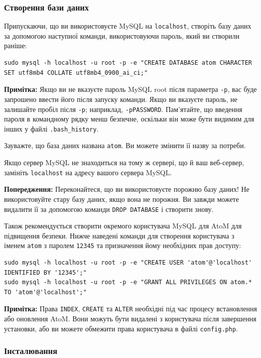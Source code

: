 \documentclass[14pt,a4paper]{article}
\begin{document}
\begin{large}
\subsubsection{Створення бази даних}
Припускаючи, що ви використовуєте MySQL на \texttt{localhost}, створіть базу даних за допомогою наступної команди, використовуючи пароль, який ви створили раніше:

\begin{lstlisting}
sudo mysql -h localhost -u root -p -e "CREATE DATABASE atom CHARACTER SET utf8mb4 COLLATE utf8mb4_0900_ai_ci;"
\end{lstlisting}

\textbf{Примітка:} Якщо ви не вказуєте пароль MySQL root після параметра \texttt{-p}, вас буде запрошено ввести його після запуску команди. Якщо ви вказуєте пароль, не залишайте пробіл після \texttt{-p}; наприклад, \texttt{-pPASSWORD}. Пам'ятайте, що введення пароля в командному рядку менш безпечне, оскільки він може бути видимим для інших у файлі \texttt{.bash\_history}.

Зауважте, що база даних названа \texttt{atom}. Ви можете змінити її назву за потреби.

Якщо сервер MySQL не знаходиться на тому ж сервері, що й ваш веб-сервер, замініть \texttt{localhost} на адресу вашого сервера MySQL.

\textbf{Попередження:} Переконайтеся, що ви використовуєте порожню базу даних! Не використовуйте стару базу даних, якщо вона не порожня. Ви завжди можете видалити її за допомогою команди \texttt{DROP DATABASE} і створити знову.


Також рекомендується створити окремого користувача MySQL для AtoM для підвищення безпеки. Нижче наведені команди для створення користувача з іменем \texttt{atom} з паролем \texttt{12345} та призначення йому необхідних прав доступу:

\begin{lstlisting}
sudo mysql -h localhost -u root -p -e "CREATE USER 'atom'@'localhost' IDENTIFIED BY '12345';"
sudo mysql -h localhost -u root -p -e "GRANT ALL PRIVILEGES ON atom.* TO 'atom'@'localhost';"
\end{lstlisting}

\textbf{Примітка:} Права \texttt{INDEX}, \texttt{CREATE} та \texttt{ALTER} необхідні під час процесу встановлення або оновлення AtoM. Вони можуть бути видалені з користувача після завершення установки, або ви можете обмежити права користувача в файлі \texttt{config.php}.
\subsubsection{Інсталювання}


\end{large}
\end{document}
